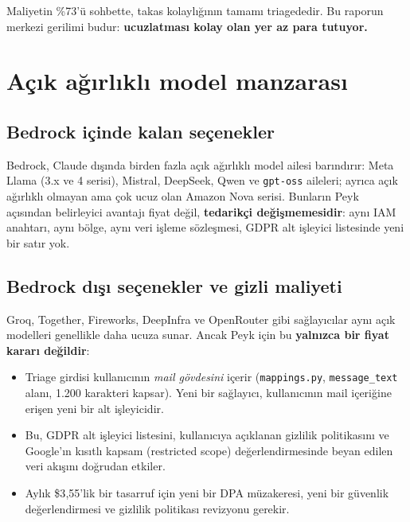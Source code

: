 \documentclass[11pt,a4paper]{article}
\newcommand{\code}[1]{\texttt{\small #1}}
\newenvironment{keybox}
  {\begin{center}\begin{lrbox}{\kbox}\begin{minipage}{0.90\textwidth}\color{ink}\small}
  {\end{minipage}\end{lrbox}\setlength{\fboxsep}{11pt}\colorbox{soft}{\usebox{\kbox}}\end{center}}
\begin{document}
\begin{keybox}
Maliyetin \%73'ü sohbette, takas kolaylığının tamamı triagededir. Bu raporun merkezi
gerilimi budur: \textbf{ucuzlatması kolay olan yer az para tutuyor.}
\end{keybox}

\section{Açık ağırlıklı model manzarası}

\subsection{Bedrock içinde kalan seçenekler}

Bedrock, Claude dışında birden fazla açık ağırlıklı model ailesi barındırır: Meta Llama
(3.x ve 4 serisi), Mistral, DeepSeek, Qwen ve \code{gpt-oss} aileleri; ayrıca açık
ağırlıklı olmayan ama çok ucuz olan Amazon Nova serisi. Bunların Peyk açısından belirleyici
avantajı fiyat değil, \textbf{tedarikçi değişmemesidir}: aynı IAM anahtarı, aynı bölge,
aynı veri işleme sözleşmesi, GDPR alt işleyici listesinde yeni bir satır yok.

\subsection{Bedrock dışı seçenekler ve gizli maliyeti}

Groq, Together, Fireworks, DeepInfra ve OpenRouter gibi sağlayıcılar aynı açık modelleri
genellikle daha ucuza sunar. Ancak Peyk için bu \textbf{yalnızca bir fiyat kararı değildir}:

\begin{itemize}[leftmargin=1.4em,itemsep=3pt]
  \item Triage girdisi kullanıcının \emph{mail gövdesini} içerir
        (\code{mappings.py}, \code{message\_text} alanı, 1.200 karakteri kapsar).
        Yeni bir sağlayıcı, kullanıcının mail içeriğine erişen yeni bir alt işleyicidir.
  \item Bu, GDPR alt işleyici listesini, kullanıcıya açıklanan gizlilik politikasını ve
        Google'ın kısıtlı kapsam (restricted scope) değerlendirmesinde beyan edilen veri
        akışını doğrudan etkiler.
  \item Aylık \$3{,}55'lik bir tasarruf için yeni bir DPA müzakeresi, yeni bir
        güvenlik değerlendirmesi ve gizlilik politikası revizyonu gerekir.
\end{itemize}
\end{document}
